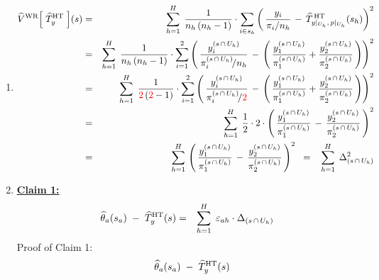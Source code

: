 \begin{enumerate}
\item
	\begin{eqnarray*}
	\widehat{V}^{\textnormal{WR}}\!\left[\;\widehat{T}^{\textnormal{HT}}_{y}\;\right]\!(s)
	& = &
		\overset{H}{\underset{h = 1}{\sum}}\;\,
		\dfrac{1}{n_{h}\,(n_{h}-1)}\cdot\underset{i \in s_{h}}{\sum}
			\left(\,
			\dfrac{y_{i}}{\pi_{i}/n_{h}}\,-\,\widehat{T}^{\,\textnormal{HT}}_{y\vert_{U_{h}},\,p\vert_{U_{h}}}(s_{h})
			\right)^{2}
	\\
	& = &
		\overset{H}{\underset{h = 1}{\sum}}\;\,
		\dfrac{1}{n_{h}\,(n_{h}-1)}\cdot\overset{2}{\underset{i = 1}{\sum}}
			\left(\,
			\dfrac{y^{(s\,\cap\,U_{h})}_{i}}{\pi^{(s\,\cap\,U_{h})}_{i}\!/n_{h}}\,-\,
			\left(\,
				\dfrac{y^{(s\,\cap\,U_{h})}_{1}}{\pi^{(s\,\cap\,U_{h})}_{1}}
				+
				\dfrac{y^{(s\,\cap\,U_{h})}_{2}}{\pi^{(s\,\cap\,U_{h})}_{2}}
				\,\right)
			\right)^{2}
	\\
	& = &
		\overset{H}{\underset{h = 1}{\sum}}\;\,
		\dfrac{1}{{\color{red}2}\,({\color{red}2}-1)}\cdot\overset{2}{\underset{i = 1}{\sum}}
			\left(\,
			\dfrac{y^{(s\,\cap\,U_{h})}_{i}}{\pi^{(s\,\cap\,U_{h})}_{i}\!/{\color{red}2}}\,-\,
			\left(\,
				\dfrac{y^{(s\,\cap\,U_{h})}_{1}}{\pi^{(s\,\cap\,U_{h})}_{1}}
				+
				\dfrac{y^{(s\,\cap\,U_{h})}_{2}}{\pi^{(s\,\cap\,U_{h})}_{2}}
				\,\right)
			\right)^{2}
	\\
	& = &
		\overset{H}{\underset{h = 1}{\sum}}\;\,
		\dfrac{1}{2} \cdot 2 \cdot
		\left(\,
			\dfrac{y^{(s\,\cap\,U_{h})}_{1}}{\pi^{(s\,\cap\,U_{h})}_{1}}
			\,-\,
			\dfrac{y^{(s\,\cap\,U_{h})}_{2}}{\pi^{(s\,\cap\,U_{h})}_{2}}
			\,\right)^{2}
	\\
	& = &
		\overset{H}{\underset{h = 1}{\sum}}\,
		\left(\,
			\dfrac{y^{(s\,\cap\,U_{h})}_{1}}{\pi^{(s\,\cap\,U_{h})}_{1}}
			\,-\,
			\dfrac{y^{(s\,\cap\,U_{h})}_{2}}{\pi^{(s\,\cap\,U_{h})}_{2}}
			\,\right)^{2}
	\;\; = \;\;\;
		\overset{H}{\underset{h=1}{\sum}}\;\, \Delta_{(s\,\cap\,U_{h})}^{2}
	\end{eqnarray*}
\item
	\underline{\textbf{Claim 1:}}
	\begin{eqnarray*}
	\widehat{\theta}_{a}(s_{a}) \;-\; \widehat{T}^{\textnormal{HT}}_{y}(s)
	& = &
		\overset{H}{\underset{h=1}{\sum}}\;\, \varepsilon_{ah} \cdot \Delta_{(s\,\cap\,U_{h})}
	\end{eqnarray*}
	Proof of Claim 1:
	\begin{eqnarray*}
	&&
		\widehat{\theta}_{a}(s_{a}) \;-\; \widehat{T}^{\textnormal{HT}}_{y}(s)
	\\

\end{eqnarray*}
\end{enumerate}
